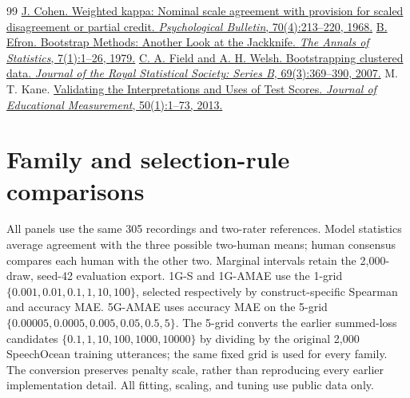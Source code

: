 \documentclass[10pt]{article}
\begin{document}
\begin{thebibliography}{99}
 \href{https://doi.org/10.1037/h0026256}{J. Cohen. Weighted kappa: Nominal scale agreement with provision for scaled disagreement or partial credit. \textit{Psychological Bulletin}, 70(4):213--220, 1968.}
 \href{https://doi.org/10.1214/aos/1176344552}{B. Efron. Bootstrap Methods: Another Look at the Jackknife. \textit{The Annals of Statistics}, 7(1):1--26, 1979.}
 \href{https://doi.org/10.1111/j.1467-9868.2007.00593.x}{C. A. Field and A. H. Welsh. Bootstrapping clustered data. \textit{Journal of the Royal Statistical Society: Series B}, 69(3):369--390, 2007.}
 M. T. Kane. \href{https://doi.org/10.1111/jedm.12000}{Validating the Interpretations and Uses of Test Scores. \textit{Journal of Educational Measurement}, 50(1):1--73, 2013.}
\end{thebibliography}

\clearpage

\appendix
\section{Family and selection-rule comparisons}\label{sec:fulltables}\label{sec:selectionrules}
All panels use the same 305 recordings and two-rater references. Model statistics average agreement with the three possible two-human means; human consensus compares each human with the other two. Marginal intervals retain the 2,000-draw, seed-42 evaluation export. 1G-S and 1G-AMAE use the 1-grid $\{0.001,0.01,0.1,1,10,100\}$, selected respectively by construct-specific Spearman and accuracy MAE. 5G-AMAE uses accuracy MAE on the 5-grid $\{0.00005,0.0005,0.005,0.05,0.5,5\}$. The 5-grid converts the earlier summed-loss candidates $\{0.1,\allowbreak1,\allowbreak10,\allowbreak100,\allowbreak1000,\allowbreak10000\}$ by dividing by the original 2,000 SpeechOcean training utterances; the same fixed grid is used for every family. The conversion preserves penalty scale, rather than reproducing every earlier implementation detail. All fitting, scaling, and tuning use public data only.
\end{document}
